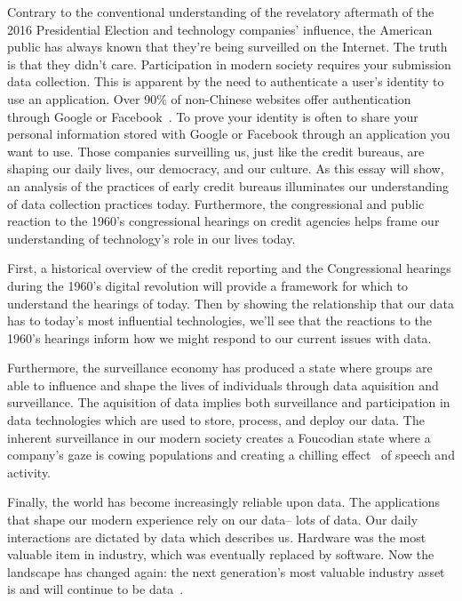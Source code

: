 Contrary to the conventional understanding of the revelatory aftermath of the
2016 Presidential Election and technology companies' influence, the American
public has always known that they're being surveilled on the Internet. The
truth is that they didn't care. Participation in modern society requires your
submission data collection. This is apparent by the need to authenticate a user's
identity to use an application. Over 90\% of non-Chinese websites offer
authentication through Google or Facebook~\cite{identity2018economist}. To
prove your identity is often to share your personal information stored with
Google or Facebook through an application you want to use. Those companies
surveilling us, just like the credit bureaus, are shaping our daily lives,
our democracy, and our culture. As this essay will show, an analysis of the
practices of early credit bureaus illuminates our understanding of data
collection practices today. Furthermore, the congressional and public reaction
to the 1960's congressional hearings on credit agencies helps frame our
understanding of technology's role in our lives today.

First, a historical overview of the credit reporting and the Congressional
hearings during the 1960's digital revolution will provide a framework for
which to understand the hearings of today. Then by showing the relationship
that our data has to today's most influential technologies, we'll see that the
reactions to the 1960's hearings inform how we might respond to our current
issues with data.

Furthermore, the surveillance economy has produced a state where groups are
able to influence and shape the lives of individuals through data aquisition
and surveillance. The aquisition of data implies both surveillance and participation in data
technologies which are used to store, process, and deploy our data. The inherent
surveillance in our modern society creates a Foucodian state where a company's gaze is cowing
populations and creating a chilling effect~\cite{richards2012dangers} of speech and activity.

Finally, the world has become increasingly reliable upon data. The applications that
shape our modern experience rely on our data-- lots of data. Our daily
interactions are dictated by data which describes us. Hardware was the most
valuable item in industry, which was eventually replaced by software. Now the
landscape has changed again: the next generation's most valuable industry asset
is and will continue to be data~\cite{janeway2018doing}.

